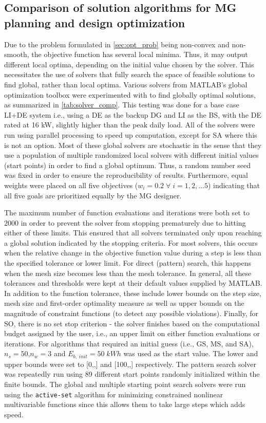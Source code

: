 \documentclass[final,3p,times]{elsarticle}
\begin{document}
\subsection{Comparison of solution algorithms for MG planning and design optimization}

Due to the problem formulated in \cref{sec:opt_prob} being non-convex and non-smooth, the objective function has several local minima. Thus, it may output different local optima, depending on the initial value chosen by the solver. This necessitates the use of solvers that fully search the space of feasible solutions to find global, rather than local optima.  Various solvers from MATLAB's global optimization toolbox were experimented with to find globally optimal solutions, as summarized in \cref{tab:solver_comp}. This testing was done for a base case LI+DE system i.e., using a DE as the backup DG and LI as the BS, with the DE rated at 16 kW, slightly higher than the peak daily load. All of the solvers were run using parallel processing to speed up computation, except for SA where this is not an option. Most of these global solvers are stochastic in the sense that they use a population of multiple randomized local solvers with different initial values (start points) in order to find a global optimum. Thus, a random number seed was fixed in order to ensure the reproducibility of results. Furthermore, equal weights were placed on all five objectives ($w_i = 0.2 \; \forall \; i=1,2,...5$) indicating that all five goals are prioritized equally by the MG designer.

The maximum number of function evaluations and iterations were both set to 2000 in order to prevent the solver from stopping prematurely due to hitting either of these limits. This ensured that all solvers terminated only upon reaching a global solution indicated by the stopping criteria. For most solvers, this occurs when the relative change in the objective function value during a step is less than the specified tolerance or lower limit. For direct (pattern) search, this happens when the mesh size becomes less than the mesh tolerance. In general, all these tolerances and thresholds were kept at their default values supplied by MATLAB. In addition to the function tolerance, these include lower bounds on the step size, mesh size and first-order optimality measure as well as upper bounds on the magnitude of constraint functions (to detect any possible violations). Finally, for SO, there is no set stop criterion - the solver finishes based on the computational budget assigned by the user, i.e., an upper limit on either function evaluations or iterations. For algorithms that required an initial guess (i.e., GS, MS, and SA), $n_s = 50$,\;$n_w = 3$ and $E_{b,\;init}=50\; kWh$ was used as the start value. The lower and upper bounds were set to [0,,] and [100,,] respectively. The pattern search solver was repeatedly run using 89 different start points randomly initialized within the finite bounds. The global and multiple starting point search solvers were run using the \texttt{active-set} algorithm for minimizing constrained nonlinear multivariable functions since this allows them to take large steps which adds speed. 
\end{document}
